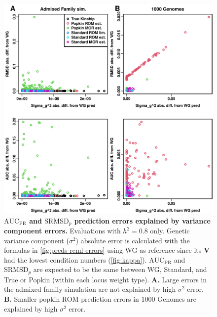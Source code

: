 \documentclass[11pt]{article}
\newcommand{\rmsd}{\text{SRMSD}_p}
\newcommand{\auc}{\text{AUC}_\text{PR}}
\begin{document}
\begin{figure}[bp!]
  \centering
  \includegraphics[width=\textwidth]{reml-err-vs-pred-err.pdf}
  \caption{
    {\bf $\auc$ and $\rmsd$ prediction errors explained by variance component errors.}
    Evaluations with $h^2=0.8$ only.
    Genetic variance component ($\sigma^2$) absolute error is calculated with the formulas in \cref{fig:preds-reml-errors} using WG as reference since its $\mathbf{V}$ had the lowest condition numbers (\cref{fig:kappa}).
    $\auc$ and $\rmsd$ are expected to be the same between WG, Standard, and True or Popkin (within each locus weight type).
    \textbf{A.}
    Large errors in the admixed family simulation are not explained by high $\sigma^2$ error.
    \textbf{B.}
    Smaller popkin ROM prediction errors in 1000 Genomes are explained by high $\sigma^2$ error.
  }
  \label{fig:reml-err-vs-pred-err}
\end{figure}
\end{document}
